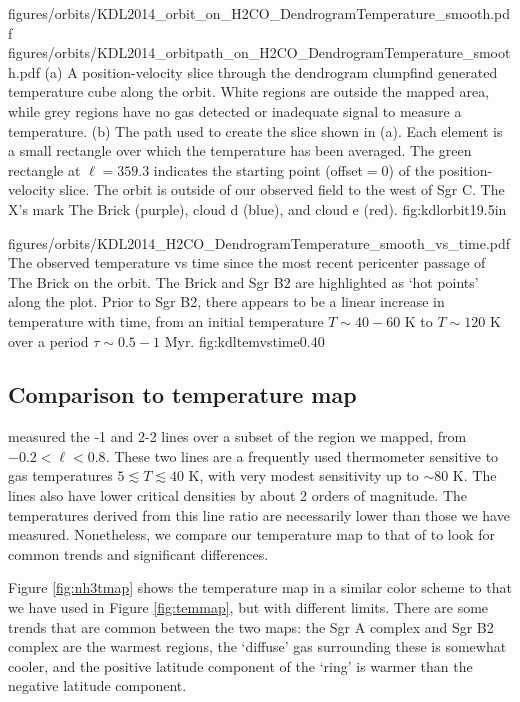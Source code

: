 \RotFigureTwoAA
{figures/orbits/KDL2014_orbit_on_H2CO_DendrogramTemperature_smooth.pdf}
{figures/orbits/KDL2014_orbitpath_on_H2CO_DendrogramTemperature_smooth.pdf}
{(a) A position-velocity slice through the dendrogram clumpfind generated
temperature cube along the \citet{Kruijssen2014d} orbit.  White regions are
outside the mapped area, while grey regions have no gas detected or inadequate
signal to measure a temperature.
(b) The path used to create the slice shown in (a).  Each element is a small
rectangle over which the temperature has been averaged.  The green rectangle at
$\ell=359.3$ indicates the starting point (offset$=0$) of the position-velocity
slice.  The orbit is outside of our observed field to the west of Sgr C.  
The X's mark The Brick (purple), cloud d (blue), and cloud e (red).
}
{fig:kdlorbit}{1}{9.5in}

\Figure
{figures/orbits/KDL2014_H2CO_DendrogramTemperature_smooth_vs_time.pdf}
{The observed temperature vs time since the most recent pericenter passage of
The Brick on the \citet{Kruijssen2014d} orbit.  The Brick and Sgr B2 are
highlighted as `hot points' along the plot.  Prior to Sgr B2, there appears to
be a linear increase in temperature with time, from an initial temperature
$T\sim40-60$ K to $T\sim120$ K over a period $\tau\sim0.5-1$ Myr.}
{fig:kdltemvstime}{0.4}{0}

\subsection{Comparison to \citet{Ott2014a} \ammonia temperature map}
\label{sec:ammoniacompare}
\citet{Ott2014a} measured the -1 and 2-2 lines over a subset of the
region we mapped, from $-0.2 < \ell < 0.8$.  These two lines are a frequently
used thermometer sensitive to gas temperatures $5 \lesssim T \lesssim 40$ K,
with very modest sensitivity up to $\sim80$ K.  The \ammonia lines also have
lower critical densities by about 2 orders of magnitude.  The temperatures
derived from this line ratio are necessarily lower than those we have measured.
Nonetheless, we compare our temperature map to that of \citet{Ott2014a} to look
for common trends and significant differences.

Figure \ref{fig:nh3tmap} shows the \citet{Ott2014a} temperature map in a
similar color scheme to that we have used in Figure \ref{fig:temmap}, but with
different limits.  There are some trends that are common between the two maps:
the Sgr A complex and Sgr B2 complex are the warmest regions, the `diffuse' gas
surrounding these is somewhat cooler, and the positive latitude component of
the \citet{Molinari2011a} `ring' is warmer than the negative latitude
component.

